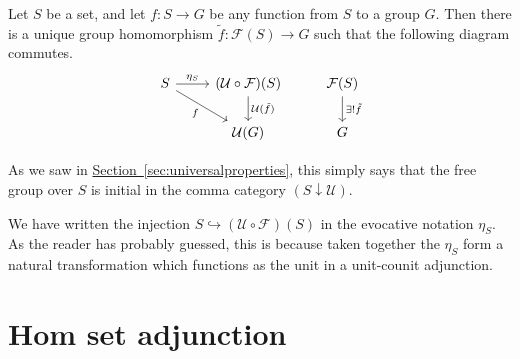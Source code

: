 \documentclass[notes.tex]{subfiles}
\begin{document}
Let $S$ be a set, and let $f\colon S \to G$ be any function from $S$ to a group $G$. Then there is a unique group homomorphism $\tilde{f}\colon \mathcal{F}(S) \to G$ such that the following diagram commutes.
\begin{equation*}
  \begin{tikzcd}
    S
    \arrow[r, "\eta_{S}"]
    \arrow[rd, swap, "f"]
    & (\mathcal{U} \circ \mathcal{F})(S)
    \arrow[d, "\mathcal{U}(\tilde{f})"]
    & \mathcal{F}(S)
    \arrow[d, "\exists!\tilde{f}"]
    \\
    & \mathcal{U}(G)
    & G
  \end{tikzcd}
\end{equation*}

As we saw in \hyperref[sec:universalproperties]{Section~\ref*{sec:universalproperties}}, this simply says that the free group over $S$ is initial in the comma category $(S \downarrow \mathcal{U})$.

We have written the injection $S \hookrightarrow (\mathcal{U} \circ \mathcal{F})(S)$ in the evocative notation $\eta_{S}$. As the reader has probably guessed, this is because taken together the $\eta_{S}$ form a natural transformation which functions as the unit in a unit-counit adjunction.

\section{Hom set adjunction}
\label{sec:hom_set_adjunction}
\end{document}

